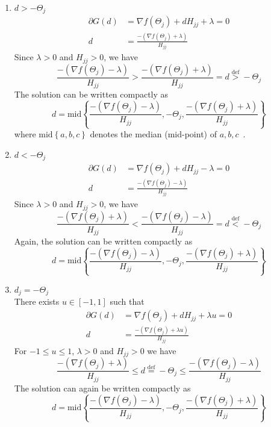 \documentclass[12pt,letter]{article}\usepackage[]{graphicx}\usepackage[]{color}
\newcommand{\tm}[1]{\textrm{{#1}}}
\begin{document}
\begin{enumerate}
	\item $d > -\Theta_j$
	\begin{align}
		\partial G(d) & = \nabla f(\Theta_{j}) + d H_{j j} + \lambda = 0 \nonumber \\
		d & = \frac{-(\nabla f(\Theta_{j}) + \lambda)}{H_{j j}}  \nonumber
	\end{align}
	Since $\lambda>0$ and $H_{jj}>0$, we have
	\begin{equation*}
		\frac{-(\nabla f(\Theta_{j}) - \lambda)}{H_{j j}} > \frac{-(\nabla f(\Theta_{j}) + \lambda)}{H_{j j}} = d \overset{\tm{def}}{>} -\Theta_j
	\end{equation*}
	The solution can be written compactly as
	\begin{equation*}
		d = \tm{mid}\left\lbrace \frac{-(\nabla f(\Theta_{j}) - \lambda)}{H_{j j}}, -\Theta_j ,\frac{-(\nabla f(\Theta_{j}) + \lambda)}{H_{j j}} \right\rbrace
	\end{equation*}
	where $\tm{mid}\left\lbrace a,b,c \right\rbrace$ denotes the median (mid-point) of $a,b,c$~\citep{tseng2009coordinate}.
	\item $d < -\Theta_j$
	\begin{align}
		\partial G(d) & = \nabla f(\Theta_{j}) + d H_{j j} - \lambda = 0 \nonumber \\
		d & = \frac{-(\nabla f(\Theta_{j}) - \lambda)}{H_{j j}}  \nonumber
	\end{align}
	Since $\lambda>0$ and $H_{jj}>0$, we have
	\begin{equation*}
		\frac{-(\nabla f(\Theta_{j}) + \lambda)}{H_{j j}} < \frac{-(\nabla f(\Theta_{j}) - \lambda)}{H_{j j}} = d \overset{\tm{def}}{<} -\Theta_j
	\end{equation*}
	Again, the solution can be written compactly as
	\begin{equation*}
		d = \tm{mid}\left\lbrace \frac{-(\nabla f(\Theta_{j}) - \lambda)}{H_{j j}}, -\Theta_j ,\frac{-(\nabla f(\Theta_{j}) + \lambda)}{H_{j j}} \right\rbrace
	\end{equation*}

	\item $d_j = -\Theta_j$\\
	There exists $u \in [-1,1]$ such that
	\begin{align*}
		\partial G(d) & = \nabla f(\Theta_{j}) + d H_{j j} + \lambda u = 0 \nonumber \\
		d & = \frac{-(\nabla f(\Theta_{j}) + \lambda u)}{H_{j j}}  \nonumber
	\end{align*}
	For $-1 \leq u \leq 1$, $\lambda>0$ and $H_{jj}>0$ we have
	\begin{equation*}
		\frac{-(\nabla f(\Theta_{j}) + \lambda)}{H_{j j}} \leq  d \overset{\tm{def}}{=} -\Theta_j \leq \frac{-(\nabla f(\Theta_{j}) - \lambda)}{H_{j j}}
	\end{equation*}
	The solution can again be written compactly as
	\begin{equation*}
		d = \tm{mid}\left\lbrace \frac{-(\nabla f(\Theta_{j}) - \lambda)}{H_{j j}}, -\Theta_j ,\frac{-(\nabla f(\Theta_{j}) + \lambda)}{H_{j j}} \right\rbrace
	\end{equation*}

\end{enumerate}
\end{document}
